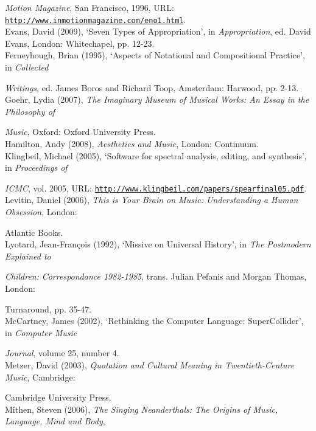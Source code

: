 \emph{Motion Magazine}, San Francisco, 1996, URL: \href{http://www.inmotionmagazine.com/eno1.html}{\texttt {http://www.inmotionmagazine.com/eno1.html}}.
\hypertarget{evans}{}\\
Evans, David (2009), `Seven Types of Appropriation', in \emph{Appropriation}, ed. David Evans, London: Whitechapel, pp. 12-23.
\hypertarget{ferneyhough}{}\\
Ferneyhough, Brian (1995), `Aspects of Notational and Compositional Practice', in \emph{Collected}

\emph{Writings}, ed. James Boros and Richard Toop, Amsterdam: Harwood, pp. 2-13.
\hypertarget{goer}{}\\
Goehr, Lydia (2007), \emph{The Imaginary Museum of Musical Works: An Essay in the Philosophy of}

\emph{Music}, Oxford: Oxford University Press.
\hypertarget{hamilton}{}\\
Hamilton, Andy (2008), \emph{Aesthetics and Music}, London: Continuum. 
\hypertarget{klingbeil}{}\\
Klingbeil, Michael (2005), `Software for spectral analysis, editing, and synthesis', in \emph{Proceedings of}

\emph{ICMC}, vol. 2005, URL: \href{http://www.klingbeil.com/papers/spearfinal05.pdf}{\texttt{http://www.klingbeil.com/papers/spearfinal05.pdf}}.
\hypertarget{musmind}{} \\ 
Levitin, Daniel (2006), \emph{This is Your Brain on Music: Understanding a Human Obsession}, London: 

Atlantic Books. 
\hypertarget{lyotard}{}\\
Lyotard, Jean-Fran\c{c}ois (1992), `Missive on Universal History', in \emph{The Postmodern Explained to}

\emph{Children:} \emph{Correspondance 1982-1985}, trans. Julian Pefanis and Morgan Thomas, London: 

Turnaround, pp. 35-47. 
\hypertarget{mccartney}{}\\
McCartney, James (2002), `Rethinking the Computer Language: SuperCollider', in \emph{Computer Music} 

\emph{Journal}, volume 25, number 4.
\hypertarget{metzer}{}\\
Metzer, David (2003), \emph{Quotation and Cultural Meaning in Twentieth-Centure Music}, Cambridge: 

Cambridge University Press. 
\hypertarget{mithen}{}\\
Mithen, Steven (2006), \emph{The Singing Neanderthals: The Origins of Music, Language, Mind and Body}, 


